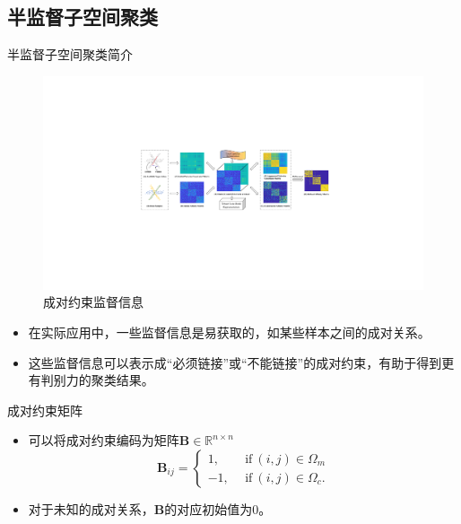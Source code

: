 \documentclass{beamer}
\begin{document}
\subsection{半监督子空间聚类}

\begin{frame}{半监督子空间聚类简介}

    \vspace{-0.3cm}
    \begin{figure}[htpb]
        \centering
        \includegraphics[width=0.25\linewidth]{pic/zhiguantu4_superpart.pdf}
        \caption{成对约束监督信息}
    \end{figure}

    \begin{itemize}
        \item 在实际应用中，一些监督信息是易获取的，如某些样本之间的成对关系。
        
        \item 这些监督信息可以表示成“必须链接”或“不能链接”的成对约束，有助于得到更有判别力的聚类结果。
 
    \end{itemize}

\end{frame}

\begin{frame}{成对约束矩阵}

    \begin{itemize}
        
        \item 可以将成对约束编码为矩阵$\mathbf{B}\in\mathbb{R}^{n\times n}$
    	\begin{equation}
    		\mathbf{B}_{ij}=\left\{\begin{aligned}
    			1, &~~\text{if}~(i, j) \in \Omega_{m} \\
    			-1, &~~\text{if}~(i, j) \in \Omega_{c}.
    		\end{aligned}\right.
    	\end{equation}
    	
        \item 对于未知的成对关系，$\mathbf{B}$的对应初始值为0。
 
    \end{itemize}

\end{frame}
\end{document}
